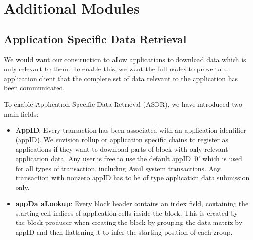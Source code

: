 \documentclass[sigconf, screen=true, nonacm]{acmart}
\begin{document}
        

\section{Additional Modules}
    \subsection{Application Specific Data Retrieval}
        We would want our construction to allow applications to download data which is only relevant to them. To enable this, we want the full nodes to prove to an application client that the complete set of data relevant to the application has been communicated.

        To enable Application Specific Data Retrieval (ASDR), we have introduced two main fields:
        \begin{itemize}
            \item \textbf{AppID}: Every transaction has been associated with an application identifier (appID). We envision rollup or application specific chains to register as applications if they want to download parts of block with only relevant application data. Any user is free to use the default appID `0' which is used for all types of transaction, including Avail system transactions. Any transaction with nonzero appID has to be of type application data submission only. 
            \item \textbf{appDataLookup}: Every block header contains an index field, containing the starting cell indices of application cells inside the block. This is created by the block producer when creating the block by grouping the data matrix by appID and then flattening it to infer the starting position of each group.  
        \end{itemize}
\end{document}
